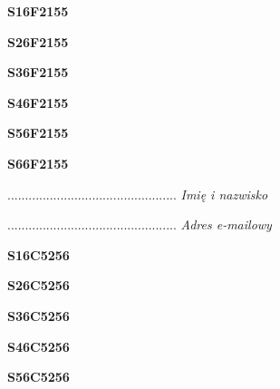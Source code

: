 \begin{turn}{90}\huge \textbf{S16F2155}\end{turn}

\begin{turn}{90}\huge \textbf{S26F2155}\end{turn}

\begin{turn}{90}\huge \textbf{S36F2155}\end{turn}

\begin{turn}{90}\huge \textbf{S46F2155}\end{turn}

\begin{turn}{90}\huge \textbf{S56F2155}\end{turn}

\begin{turn}{90}\huge \textbf{S66F2155}\end{turn}

\begin{turn}{90}\begin{minipage}{\linewidth} \vspace{20mm} ................................................  \textit{Imię i nazwisko}\end{minipage}\end{turn}

\begin{turn}{90}\begin{minipage}{\linewidth} \vspace{20mm} ................................................  \textit{Adres e-mailowy}\end{minipage}\end{turn}

\begin{turn}{90}\huge \textbf{S16C5256}\end{turn}

\begin{turn}{90}\huge \textbf{S26C5256}\end{turn}

\begin{turn}{90}\huge \textbf{S36C5256}\end{turn}

\begin{turn}{90}\huge \textbf{S46C5256}\end{turn}

\begin{turn}{90}\huge \textbf{S56C5256}\end{turn}

